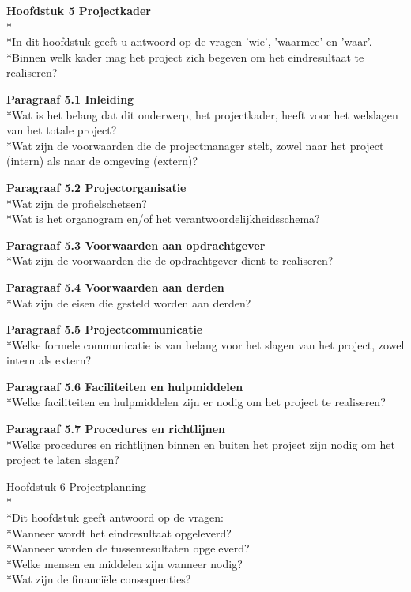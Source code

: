 \documentclass{article}
\begin{document}
\textbf{Hoofdstuk 5 Projectkader}
\\*
\\*In dit hoofdstuk geeft u antwoord op de vragen 'wie', 'waarmee' en 'waar'.
\\*Binnen welk kader mag het project zich begeven om het eindresultaat te realiseren?
\newline

\noindent
\textbf{Paragraaf 5.1 Inleiding}
\\*Wat is het belang dat dit onderwerp, het projectkader, heeft voor het welslagen van het totale project?
\\*Wat zijn de voorwaarden die de projectmanager stelt, zowel naar het project (intern) als naar de omgeving (extern)?
\newline

\noindent
\textbf{Paragraaf 5.2 Projectorganisatie}
\\*Wat zijn de profielschetsen?
\\*Wat is het organogram en/of het verantwoordelijkheidsschema?
\newline

\noindent
\textbf{Paragraaf 5.3 Voorwaarden aan opdrachtgever}
\\*Wat zijn de voorwaarden die de opdrachtgever dient te realiseren?
\newline

\noindent
\textbf{Paragraaf 5.4 Voorwaarden aan derden}
\\*Wat zijn de eisen die gesteld worden aan derden?
\newline

\noindent
\textbf{Paragraaf 5.5 Projectcommunicatie}
\\*Welke formele communicatie is van belang voor het slagen van het project, zowel intern als extern?
\newline

\noindent
\textbf{Paragraaf 5.6 Faciliteiten en hulpmiddelen}
\\*Welke faciliteiten en hulpmiddelen zijn er nodig om het project te realiseren?
\newline

\noindent
\textbf{Paragraaf 5.7 Procedures en richtlijnen}
\\*Welke procedures en richtlijnen binnen en buiten het project zijn nodig om het project te laten slagen?
\newline
\newline

Hoofdstuk 6 Projectplanning
\\*
\\*Dit hoofdstuk geeft antwoord op de vragen:
\\*Wanneer wordt het eindresultaat opgeleverd?
\\*Wanneer worden de tussenresultaten opgeleverd?
\\*Welke mensen en middelen zijn wanneer nodig?
\\*Wat zijn de financiële consequenties?
\newline
\end{document}
